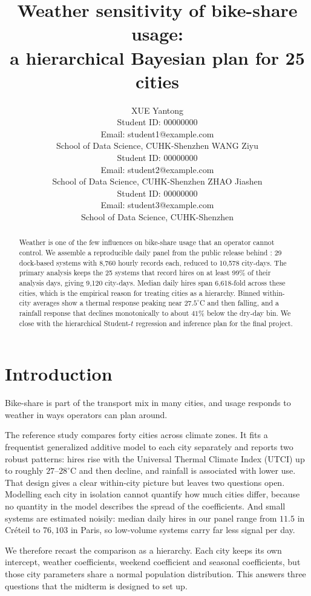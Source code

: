\documentclass{article}
\title{Weather sensitivity of bike-share usage:\\ a hierarchical Bayesian plan for 25 cities}
\author{%
  XUE Yantong \\
  Student ID: 00000000 \\
  Email: student1@example.com \\
  School of Data Science, CUHK-Shenzhen
  \And
  WANG Ziyu \\
  Student ID: 00000000 \\
  Email: student2@example.com \\
  School of Data Science, CUHK-Shenzhen
  \And
  ZHAO Jiashen \\
  Student ID: 00000000 \\
  Email: student3@example.com \\
  School of Data Science, CUHK-Shenzhen
}
\begin{document}
\maketitle

\begin{abstract}
Weather is one of the few influences on bike-share usage that an operator cannot
control.
We assemble a reproducible daily panel from the public release behind
\citet{bean2021weather}: 29 dock-based systems with 8{,}760 hourly records each,
reduced to 10{,}578 city-days. The primary analysis keeps the 25 systems that
record hires on at least 99\% of their analysis days, giving 9{,}120 city-days.
Median daily hires span 6{,}618-fold across these cities,
which is the empirical reason for treating cities as a hierarchy. Binned
within-city averages show a thermal response
peaking near $27.5^\circ$C and then falling, and a rainfall response that
declines monotonically to about $41\%$ below the dry-day bin. We close with the
hierarchical Student-$t$ regression and inference plan for the final project.
\end{abstract}

\section{Introduction}

Bike-share is part of the transport mix in many cities, and usage responds to
weather in ways operators can plan around.

The reference study \citep{bean2021weather} compares forty cities across climate
zones. It fits a frequentist generalized additive model to each city separately
and reports two robust patterns: hires rise with the Universal Thermal Climate
Index (UTCI) up to roughly $27$--$28^\circ$C and then decline, and rainfall is
associated with lower use. That design gives a clear within-city picture but
leaves two questions open. Modelling each city in isolation cannot quantify how
much cities differ, because no quantity in the model describes the spread of the
coefficients. And small systems are estimated noisily: median daily hires in our
panel range from $11.5$ in Cr{\'e}teil to $76{,}103$ in Paris, so low-volume
systems carry far less signal per day.

We therefore recast the comparison as a hierarchy. Each city keeps its own
intercept, weather coefficients, weekend coefficient and seasonal coefficients,
but those city parameters share a normal population distribution. This answers
three questions that the midterm is designed to set up.
\end{document}
